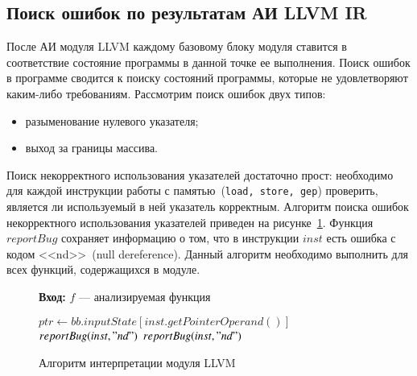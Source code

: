 \subsection{Поиск ошибок по результатам АИ LLVM IR}
После АИ модуля LLVM каждому базовому блоку модуля ставится в соответствие
состояние программы в данной точке ее выполнения. Поиск ошибок в программе
сводится к поиску состояний программы, которые не удовлетворяют каким-либо
требованиям. Рассмотрим поиск ошибок двух типов:
\begin{itemize}
\item разыменование нулевого указателя;
\item выход за границы массива.
\end{itemize}

Поиск некорректного использования указателей достаточно прост: необходимо для
каждой инструкции работы с памятью~(\texttt{load, store, gep}) проверить, 
является ли используемый в ней указатель корректным. Алгоритм поиска ошибок
некорректного использования указателей приведен на 
рисунке~\ref{image:ndChecker}. Функция $reportBug$ сохраняет информацию
о том, что в инструкции $inst$ есть ошибка с кодом <<nd>>~(null dereference). 
Данный алгоритм необходимо выполнить для всех функций, содержащихся в модуле.
\begin{figure}[h!]
\textbf{Вход:} $f$ --- анализируемая функция

\begin{algorithmic}[1]
            \State $ptr \gets bb.inputState[inst.getPointerOperand()]$
                \State $reportBug(inst, "nd")$
                \State $reportBug(inst, "nd")$
            \EndIf
        \EndIf
    \EndFor
\EndFor
\end{algorithmic}
\caption{Алгоритм интерпретации модуля LLVM}
\label{image:ndChecker}
\end{figure}

